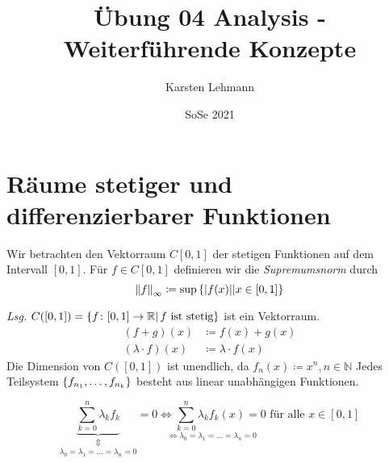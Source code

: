 \documentclass{article}
\author{Karsten Lehmann}
\date{SoSe 2021}
\title{Übung 04 Analysis - Weiterführende Konzepte}
\begin{document}
\section*{Räume stetiger und differenzierbarer Funktionen}

Wir betrachten den Vektorraum $C[0, 1]$ der stetigen Funktionen auf dem
Intervall $[0, 1]$.
Für $f \in C[0, 1]$ definieren wir die \textit{Supremumsnorm} durch
\[
  \norm{f}_{\infty} \coloneqq \sup\qty{\abs{f(x)} \middle| x \in [0, 1]}
\]

\textit{Lsg.} $C([0, 1]) = \qty{f \colon [0, 1] \to \mathbb{R} \middle| \,\text{$f$ ist stetig}}$ ist ein Vektorraum.
  \begin{align*}
    (f + g)(x) &\coloneqq f(x) + g(x) \\
    (\lambda \cdot f)(x) &\coloneqq \lambda \cdot f(x)
  \end{align*}
  Die Dimension von $C([0, 1])$ ist unendlich, da
  $f_n(x) \coloneqq x^n, n \in \mathbb{N}$
  Jedes Teilsystem $\qty{f_{n_1}, \ldots, f_{n_k}}$ besteht aus linear unabhängigen Funktionen.

  \[
    \underset{\lambda_0 = \lambda_1 = \ldots = \lambda_n = 0}{\underset{\Updownarrow}{\underbrace{\sum_{k = 0}^n \lambda_k f_k}}} = 0
    \underset{\iff \lambda_0 = \lambda_1 = \ldots = \lambda_n = 0}{\iff \sum_{k = 0}^n \lambda_k f_k(x) = 0} \text{ für alle } x \in [0, 1]
  \]
\end{document}
